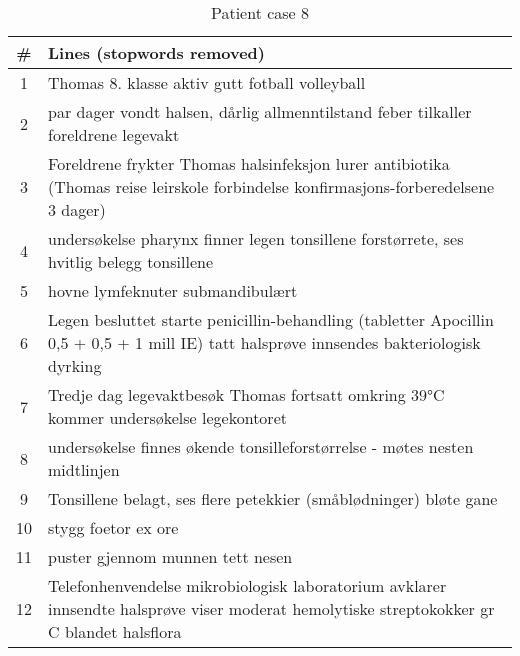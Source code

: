 \begin{table}[htbp] \footnotesize \center
\caption[]{Patient case 8\label{tab:case8}}
\begin{tabularx}{\textwidth}{c X}
    \toprule
    \# & Lines (stopwords removed) \\
    \midrule
    1 & Thomas 8. klasse aktiv gutt fotball volleyball \\
    2 & par dager vondt halsen, dårlig allmenntilstand feber tilkaller foreldrene legevakt \\
    3 & Foreldrene frykter Thomas halsinfeksjon lurer antibiotika (Thomas reise leirskole forbindelse konfirmasjons-forberedelsene 3 dager) \\
    4 & undersøkelse pharynx finner legen tonsillene forstørrete, ses hvitlig belegg tonsillene \\
    5 & hovne lymfeknuter submandibulært \\
    6 & Legen besluttet starte penicillin-behandling (tabletter Apocillin 0,5 + 0,5 + 1 mill IE) tatt halsprøve innsendes bakteriologisk dyrking \\
    7 & Tredje dag legevaktbesøk Thomas fortsatt omkring 39°C kommer undersøkelse legekontoret \\
    8 & undersøkelse finnes økende tonsilleforstørrelse - møtes nesten midtlinjen \\
    9 & Tonsillene belagt, ses flere petekkier (småblødninger) bløte gane \\
    10 & stygg foetor ex ore \\
    11 & puster gjennom munnen tett nesen \\
    12 & Telefonhenvendelse mikrobiologisk laboratorium avklarer innsendte halsprøve viser moderat hemolytiske streptokokker gr C blandet halsflora \\
    \bottomrule
\end{tabularx}
\end{table}


